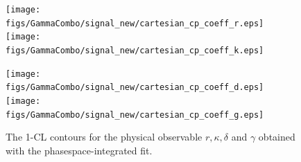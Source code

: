 \begin{figure}[h]
	\centering
		\texttt{[image: figs/GammaCombo/signal\_new/cartesian\_cp\_coeff\_r.eps]} 
		\texttt{[image: figs/GammaCombo/signal\_new/cartesian\_cp\_coeff\_k.eps]} 
		
		\texttt{[image: figs/GammaCombo/signal\_new/cartesian\_cp\_coeff\_d.eps]} 
		\texttt{[image: figs/GammaCombo/signal\_new/cartesian\_cp\_coeff\_g.eps]} 
		\caption{The 1-CL contours for the physical observable $r,\kappa,\delta$ and $\gamma$ obtained with the phasespace-integrated fit. }
		\label{fig:FitCL}	
\end{figure} 

%
%
%





